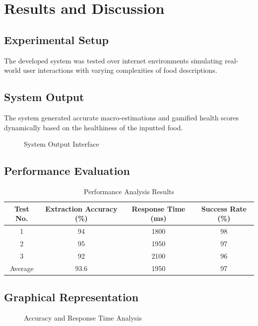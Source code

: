 \documentclass[12pt,a4paper]{report}
\begin{document}
\chapter{Results and Discussion}

\section{Experimental Setup}
The developed system was tested over internet environments simulating real-world user interactions with varying complexities of food descriptions.

\section{System Output}
The system generated accurate macro-estimations and gamified health scores dynamically based on the healthiness of the inputted food.

\begin{figure}[H]
    \centering
    \fbox{\rule{0pt}{1.5in} \rule{0.6\textwidth}{0pt}}
    \caption{System Output Interface}
\end{figure}

\section{Performance Evaluation}
\begin{table}[H]
\centering
\begin{tabular}{|c|c|c|c|}
\hline
\textbf{Test No.} & \textbf{Extraction Accuracy (\%)} & \textbf{Response Time (ms)} & \textbf{Success Rate (\%)} \\ \hline
1 & 94 & 1800 & 98 \\ \hline
2 & 95 & 1950 & 97 \\ \hline
3 & 92 & 2100 & 96 \\ \hline
Average & 93.6 & 1950 & 97 \\ \hline
\end{tabular}
\caption{Performance Analysis Results}
\end{table}

\section{Graphical Representation}
\begin{figure}[H]
    \centering
    \fbox{\rule{0pt}{1.5in} \rule{0.6\textwidth}{0pt}}
    \caption{Accuracy and Response Time Analysis}
\end{figure}
\end{document}
